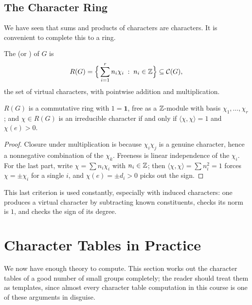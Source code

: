 \documentclass[a4paper]{scrartcl}
\newcommand{\ip}[2]{\langle #1, #2 \rangle}
\begin{document}
\subsection{The Character Ring}

We have seen that sums and products of characters are characters. It is convenient to complete this to a ring.

\begin{definition}
	The  (or ) of $G$ is
	$$R(G) = \Big\{\sum_{i=1}^r n_i\chi_i \; : \; n_i \in \mathbb{Z}\Big\} \subseteq \mathcal{C}(G),$$
	the set of virtual characters, with pointwise addition and multiplication.
\end{definition}

\begin{proposition}
	$R(G)$ is a commutative ring with $1 = \mathbf 1$, free as a $\mathbb{Z}$-module with basis $\chi_1,\dots,\chi_r$; and $\chi \in R(G)$ is an irreducible character if and only if $\ip\chi\chi = 1$ and $\chi(e) > 0$.
\end{proposition}
\begin{proof}
	Closure under multiplication is because $\chi_i\chi_j$ is a genuine character, hence a nonnegative combination of the $\chi_k$. Freeness is linear independence of the $\chi_i$. For the last part, write $\chi = \sum n_i\chi_i$ with $n_i\in\mathbb{Z}$; then $\ip\chi\chi = \sum n_i^2 = 1$ forces $\chi = \pm\chi_i$ for a single $i$, and $\chi(e) = \pm d_i > 0$ picks out the sign.
\end{proof}

This last criterion is used constantly, especially with induced characters: one produces a virtual character by subtracting known constituents, checks its norm is $1$, and checks the sign of its degree.

\section{Character Tables in Practice}

We now have enough theory to compute. This section works out the character tables of a good number of small groups completely; the reader should treat them as templates, since almost every character table computation in this course is one of these arguments in disguise.
\end{document}
